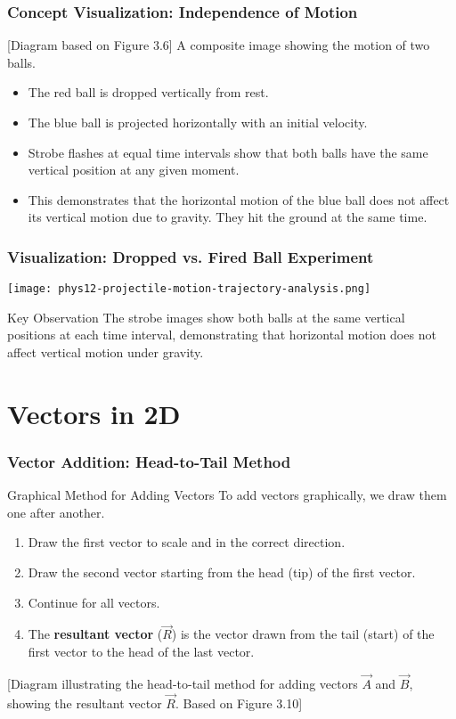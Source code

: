 \documentclass{beamer}
\begin{document}
\begin{frame}
\frametitle{Concept Visualization: Independence of Motion}
\begin{alertblock}{[Diagram based on Figure 3.6]}
A composite image showing the motion of two balls.
\begin{itemize}
    \item The red ball is dropped vertically from rest.
    \item The blue ball is projected horizontally with an initial velocity.
    \item Strobe flashes at equal time intervals show that both balls have the same vertical position at any given moment.
    \item This demonstrates that the horizontal motion of the blue ball does not affect its vertical motion due to gravity. They hit the ground at the same time.
\end{itemize}
\end{alertblock}
\end{frame}

\begin{frame}
\frametitle{Visualization: Dropped vs. Fired Ball Experiment}
\begin{center}
\texttt{[image: phys12-projectile-motion-trajectory-analysis.png]}
\end{center}
\begin{block}{Key Observation}
The strobe images show both balls at the same vertical positions at each time interval, demonstrating that horizontal motion does not affect vertical motion under gravity.
\end{block}
\end{frame}

\section{Vectors in 2D}

\begin{frame}
\frametitle{Vector Addition: Head-to-Tail Method}
\begin{block}{Graphical Method for Adding Vectors}
To add vectors graphically, we draw them one after another.
\end{block}
\begin{enumerate}
    \item Draw the first vector to scale and in the correct direction.
    \item Draw the second vector starting from the head (tip) of the first vector.
    \item Continue for all vectors.
    \item The \textbf{resultant vector} ($\vec{R}$) is the vector drawn from the tail (start) of the first vector to the head of the last vector.
\end{enumerate}
\vfill
\begin{alertblock}{[Diagram illustrating the head-to-tail method for adding vectors $\vec{A}$ and $\vec{B}$, showing the resultant vector $\vec{R}$. Based on Figure 3.10]}
\end{alertblock}
\end{frame}
\end{document}
